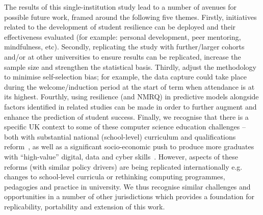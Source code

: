 \documentclass[sigconf]{acmart}
\begin{document}
The results of this single-institution study lead to a number of avenues for possible future work, framed around the following five themes. Firstly, initiatives related to the development of student resilience can be deployed and their effectiveness evaluated (for example: personal development, peer mentoring, mindfulness, etc). Secondly, replicating the study with further/larger cohorts and/or at other universities to ensure results can be replicated, increase the sample size and strengthen the statistical basis. Thirdly, adjust the methodology to minimise self-selection bias; for example, the data capture could take place during the welcome/induction period at the start of term when attendance is at its highest. Fourthly, using resilience (and NMRQ) in predictive models alongside factors identified in related studies can be made in order to further augment and enhance the prediction of student success. Finally, we recognise that there is a specific UK context to some of these computer science education challenges -- both with substantial national (school-level) curriculum and qualifications reform~\cite{brown-et-al-toce2014}, as well as a significant socio-economic push to produce more graduates with ``high-value'' digital, data and cyber skills~\cite{crick-et-al:fie2019,crick-et-al-accred:cep2020}. However, aspects of these reforms (with similar policy drivers) are being replicated internationally e.g. changes to school-level curricula or rethinking computing programmes, pedagogies and practice in university. We thus recognise similar challenges and opportunities in a number of other jurisdictions which provides a foundation for replicability, portability and extension of this work.




\appendix
\end{document}
